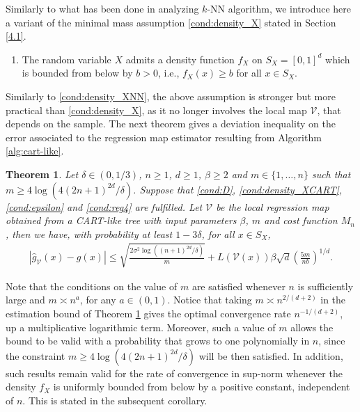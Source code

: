 \documentclass[paper=a4, fontsize=11pt]{scrartcl}
\newtheorem{theorem}{Theorem}
\begin{document}
Similarly to what has been done in analyzing $k$-NN algorithm, we introduce here a variant of the minimal mass assumption \ref{cond:density_X} stated in Section \ref{4.1}. %

\begin{enumerate}[label=(XTREE), wide=0.5em,  leftmargin=*]
\item  \label{cond:density_XCART} The random variable $X$ admits a density function $f_X$ on $S_X = [0,1]^d$ which is bounded from below by $b >0$, i.e., $f_X(x) \geq b$ for all $x\in S_X$.
\end{enumerate}


Similarly to \ref{cond:density_XNN}, the above assumption is stronger but more practical than \ref{cond:density_X}, as it no longer involves the local map $\mathcal V$, that depends on the sample. The next theorem gives a deviation inequality on the error associated to the regression map estimator resulting from Algorithm \ref{alg:cart-like}. 




\begin{theorem}\label{th_cart_like1}
Let  $\delta \in (0,1/3) $, $n\geq 1$, $d\geq 1$, $\beta\geq 2$ and $m\in \{1,\ldots,  n\}$ such  that $m\geq  4\log(4(2n+1)^{2d}/\delta )$. Suppose that \ref{cond:D}, \ref{cond:density_XCART}, \ref{cond:epsilon} and \ref{cond:reg4} are fulfilled. Let $\mathcal V$ be the local regression map obtained from a CART-like tree with input parameters $\beta $, $m$ and cost function $M_n$, then we have, with probability at least $1-3\delta$, for all $x \in S_X$,
    \begin{align*} 
            |  \hat g_\mathcal V (x) - g(x)  | \leq \sqrt { \frac{2 \sigma ^2 \log((n+1) ^{2d}/\delta) } {  m}} + L(\mathcal{V}(x)) \beta \sqrt{d} \left(\frac{5 m}{ n b}\right)^{1/d}.
    \end{align*}
\end{theorem}

Note that the conditions on the value of $m$ are satisfied whenever $n$ is sufficiently large and $m\asymp n^a $, 
 for any $a\in (0,1)$. Notice that taking $m \asymp n^{2/(d+2)}$ in the estimation bound of Theorem \ref{th_cart_like1} gives the optimal convergence rate $n^{-1/(d+2)}$, up a multiplicative logarithmic term. Moreover, such a value of $m$ allows the bound to be valid with a probability that grows to one polynomially in $n$, since the constraint $m \geq 4\log(4(2n+1)^{2d}/\delta )$ will be then satisfied.
In addition, such results remain valid for the rate of convergence in sup-norm whenever the density $f_X$ is uniformly bounded from below by a positive constant, independent of $n$. This is stated in the subsequent corollary.
\end{document}
